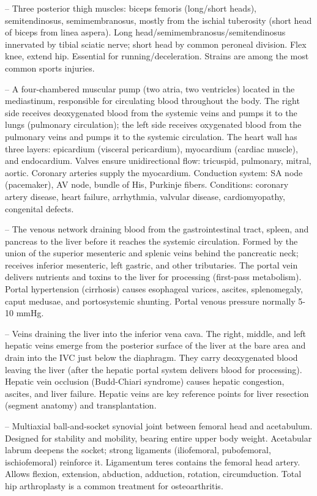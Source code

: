 -- Three posterior thigh muscles: biceps femoris (long/short heads), semitendinosus, semimembranosus, mostly from the ischial tuberosity (short head of biceps from linea aspera). Long head/semimembranosus/semitendinosus innervated by tibial sciatic nerve; short head by common peroneal division. Flex knee, extend hip. Essential for running/deceleration. Strains are among the most common sports injuries.

-- A four-chambered muscular pump (two atria, two ventricles) located in the mediastinum, responsible for circulating blood throughout the body. The right side receives deoxygenated blood from the systemic veins and pumps it to the lungs (pulmonary circulation); the left side receives oxygenated blood from the pulmonary veins and pumps it to the systemic circulation. The heart wall has three layers: epicardium (visceral pericardium), myocardium (cardiac muscle), and endocardium. Valves ensure unidirectional flow: tricuspid, pulmonary, mitral, aortic. Coronary arteries supply the myocardium. Conduction system: SA node (pacemaker), AV node, bundle of His, Purkinje fibers. Conditions: coronary artery disease, heart failure, arrhythmia, valvular disease, cardiomyopathy, congenital defects.

-- The venous network draining blood from the gastrointestinal tract, spleen, and pancreas to the liver before it reaches the systemic circulation. Formed by the union of the superior mesenteric and splenic veins behind the pancreatic neck; receives inferior mesenteric, left gastric, and other tributaries. The portal vein delivers nutrients and toxins to the liver for processing (first-pass metabolism). Portal hypertension (cirrhosis) causes esophageal varices, ascites, splenomegaly, caput medusae, and portosystemic shunting. Portal venous pressure normally 5-10 mmHg.

-- Veins draining the liver into the inferior vena cava. The right, middle, and left hepatic veins emerge from the posterior surface of the liver at the bare area and drain into the IVC just below the diaphragm. They carry deoxygenated blood leaving the liver (after the hepatic portal system delivers blood for processing). Hepatic vein occlusion (Budd-Chiari syndrome) causes hepatic congestion, ascites, and liver failure. Hepatic veins are key reference points for liver resection (segment anatomy) and transplantation.

-- Multiaxial ball-and-socket synovial joint between femoral head and acetabulum. Designed for stability and mobility, bearing entire upper body weight. Acetabular labrum deepens the socket; strong ligaments (iliofemoral, pubofemoral, ischiofemoral) reinforce it. Ligamentum teres contains the femoral head artery. Allows flexion, extension, abduction, adduction, rotation, circumduction. Total hip arthroplasty is a common treatment for osteoarthritis.

